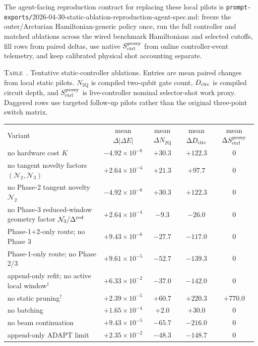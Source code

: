\documentclass[
  reprint,
  amsmath,
  amssymb,
  aps,
  pra,
  nofootinbib,
  superscriptaddress,
  floatfix
]{revtex4-2}
\newcommand{\twq}{\mathrm{2Q}}
\newcommand{\inlinetablecaption}[2]{%
  \refstepcounter{table}\label{#1}%
  \noindent\textsc{Table~\thetable.} #2\par\vspace{0.6ex}%
}
\begin{document}
The agent-facing reproduction contract for replacing these local pilots is \texttt{prompt-exports/}2026-04-30-static-ablation-reproduction-agent-spec.md: freeze the outer/Arcturian Hamiltonian-generic policy once, run the full controller and matched ablations across the wired benchmark Hamiltonians and selected cutoffs, fill rows from paired deltas, use native $S_{\rm ctrl}^{\rm proxy}$ from online controller-event telemetry, and keep calibrated physical shot accounting separate.

\begin{widetext}
\inlinetablecaption{tab:ablation_matrix}{Tentative static-controller ablations. Entries are mean paired changes from local static pilots. $N_{\twq}$ is compiled two-qubit gate count, $D_{\rm circ}$ is compiled circuit depth, and $S_{\rm ctrl}^{\rm proxy}$ is live-controller nominal selector-shot work proxy. Daggered rows use targeted follow-up pilots rather than the original three-point switch matrix.}
\begin{center}
\begin{ruledtabular}
\begin{tabular}{p{}cccc}
Variant & mean $\Delta|\Delta E|$ & mean $\Delta N_{\twq}$ & mean $\Delta D_{\rm circ}$ & mean $\Delta S_{\rm ctrl}^{\rm proxy}$ \\
\colrule
no hardware cost $K$ & $-4.92\!\times\!10^{-8}$ & $+30.3$ & $+122.3$ & $0$ \\
no tangent novelty factors $(\mathcal N_2,\mathcal N_3)$ & $+2.64\!\times\!10^{-4}$ & $+21.3$ & $+97.7$ & $0$ \\
no Phase-2 tangent novelty $\mathcal N_2$ & $-4.92\!\times\!10^{-8}$ & $+30.3$ & $+122.3$ & $0$ \\
no Phase-3 reduced-window geometry factor $\mathcal N_3/\Delta^{\rm red}$ & $+2.64\!\times\!10^{-4}$ & $-9.3$ & $-26.0$ & $0$ \\
Phase-1+2-only route; no Phase 3 & $+9.43\!\times\!10^{-6}$ & $-27.7$ & $-117.0$ & $0$ \\
Phase-1-only route; no Phase 2/3 & $+9.61\!\times\!10^{-5}$ & $-52.7$ & $-139.3$ & $0$ \\
append-only refit; no active local window$^\dagger$ & $+6.33\!\times\!10^{-2}$ & $-37.0$ & $-142.0$ & $0$ \\
no static pruning$^\dagger$ & $+2.39\!\times\!10^{-5}$ & $+60.7$ & $+220.3$ & $+770.0$ \\
no batching & $+1.65\!\times\!10^{-4}$ & $+2.0$ & $+30.0$ & $0$ \\
no beam continuation & $+9.43\!\times\!10^{-5}$ & $-65.7$ & $-216.0$ & $0$ \\
append-only ADAPT limit & $+2.35\!\times\!10^{-2}$ & $-48.3$ & $-148.7$ & $0$ \\
\end{tabular}
\end{ruledtabular}
\end{center}
\end{widetext}
\end{document}
